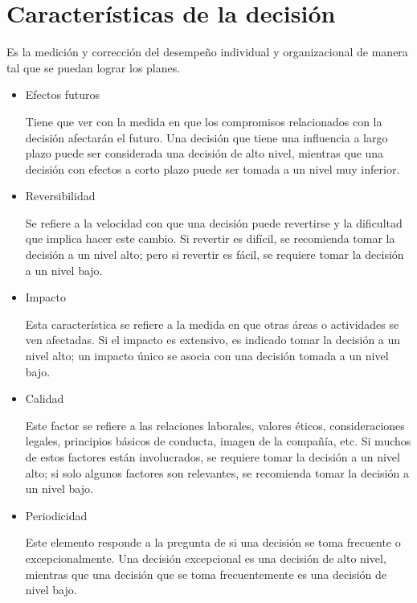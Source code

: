 \section{Características de la decisión} 

Es la medición y corrección del desempeño individual y organizacional de manera tal que se puedan lograr los planes.

\begin{itemize}
\item Efectos futuros  

Tiene que ver con la medida en que los compromisos relacionados con la decisión afectarán el futuro. Una decisión que tiene una influencia a largo plazo puede ser considerada una decisión de alto nivel, mientras que una decisión con efectos a corto plazo puede ser tomada a un nivel muy inferior. 
\item Reversibilidad 

 Se refiere a la velocidad con que una decisión puede revertirse y la dificultad que implica hacer este cambio. Si revertir es difícil, se recomienda tomar la decisión a un nivel alto; pero si revertir es fácil, se requiere tomar la decisión a un nivel bajo. 
 
 \item Impacto 

Esta característica se refiere a la medida en que otras áreas o actividades se ven afectadas. Si el impacto es extensivo, es indicado tomar la decisión a un nivel alto; un impacto único se asocia con una decisión tomada a un nivel bajo. 

\item Calidad  

Este factor se refiere a las relaciones laborales, valores éticos, consideraciones legales, principios básicos de conducta, imagen de la compañía, etc. Si muchos de estos factores están involucrados, se requiere tomar la decisión a un nivel alto; si solo algunos factores son relevantes, se recomienda tomar la decisión a un nivel bajo. 

\item Periodicidad 

Este elemento responde a la pregunta de si una decisión se toma frecuente o excepcionalmente. Una decisión excepcional es una decisión de alto nivel, mientras que una decisión que se toma frecuentemente es una decisión de nivel bajo.\cite{TecnicasDecisiones}

\end{itemize}


